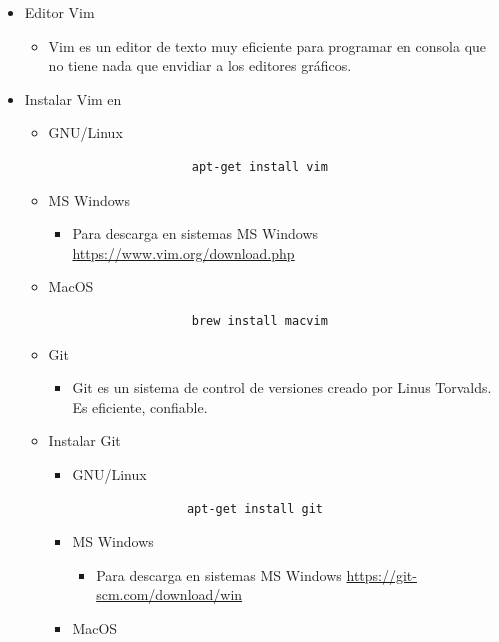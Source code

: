 \documentclass{article}
\begin{document}
	\begin{itemize}
		\item Editor Vim
        \begin{itemize}
            \item Vim es un editor de texto muy eficiente para programar en consola que no tiene nada que envidiar a los editores gráficos.
        \end{itemize}
        \item Instalar Vim en
        \begin{itemize}
            \item GNU/Linux
                \begin{lstlisting}
                    apt-get install vim
                \end{lstlisting}
            \item MS Windows
            \begin{itemize}
                \item Para descarga en sistemas MS Windows \url{https://www.vim.org/download.php}
            \end{itemize}
            \item MacOS
                \begin{lstlisting}
                    brew install macvim
                \end{lstlisting}
        \item Git
        \begin{itemize}
            \item Git es un sistema de control de versiones creado por Linus Torvalds. Es eficiente, confiable.
        \end{itemize}
        \item Instalar Git
        \begin{itemize}
            \item GNU/Linux
                \begin{lstlisting}
                apt-get install git    
                \end{lstlisting}
            \item MS Windows
            \begin{itemize}
                \item Para descarga en sistemas MS Windows \url{https://git-scm.com/download/win}
            \end{itemize}
            \item MacOS
            \begin{itemize}

\end{itemize}
\end{itemize}
\end{itemize}
\end{itemize}
\end{document}
